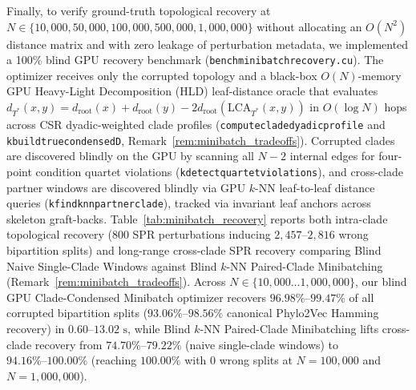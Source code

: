 \documentclass[11pt,a4paper]{article}
\makeatletter
\DeclareRobustCommand{\_}{\ifmmode\nfss@text{\textunderscore}\else\textunderscore\allowbreak\fi}
\theoremstyle{definition}
\makeatother
\begin{document}
Finally, to verify ground-truth topological recovery at $N \in \{10{,}000, 50{,}000, 100{,}000, 500{,}000, 1{,}000{,}000\}$ without allocating an $O(N^2)$ distance matrix and with zero leakage of perturbation metadata, we implemented a 100\% blind GPU recovery benchmark (\texttt{bench\_minibatch\_recovery.cu}). The optimizer receives only the corrupted topology and a black-box $O(N)$-memory GPU Heavy-Light Decomposition (HLD) leaf-distance oracle that evaluates $d_{T^*}(x,y) = d_{\text{root}}(x) + d_{\text{root}}(y) - 2 d_{\text{root}}(\text{LCA}_{T^*}(x,y))$ in $O(\log N)$ hops across CSR dyadic-weighted clade profiles (\texttt{compute\_clade\_dyadic\_profile} and \texttt{k\_build\_true\_condensed\_D}, Remark~\ref{rem:minibatch_tradeoffs}). Corrupted clades are discovered blindly on the GPU by scanning all $N-2$ internal edges for four-point condition quartet violations (\texttt{k\_detect\_quartet\_violations}), and cross-clade partner windows are discovered blindly via GPU $k$-NN leaf-to-leaf distance queries (\texttt{k\_find\_knn\_partner\_clade}), tracked via invariant leaf anchors across skeleton graft-backs. Table~\ref{tab:minibatch_recovery} reports both intra-clade topological recovery ($800$ SPR perturbations inducing $2{,}457\text{--}2{,}816$ wrong bipartition splits) and long-range cross-clade SPR recovery comparing Blind Naive Single-Clade Windows against Blind $k$-NN Paired-Clade Minibatching (Remark~\ref{rem:minibatch_tradeoffs}). Across $N \in \{10{,}000 \dots 1{,}000{,}000\}$, our blind GPU Clade-Condensed Minibatch optimizer recovers $\mathbf{96.98\%\text{--}99.47\%}$ of all corrupted bipartition splits ($\mathbf{93.06\%\text{--}98.56\%}$ canonical Phylo2Vec Hamming recovery) in $0.60\text{--}13.02\text{ s}$, while Blind $k$-NN Paired-Clade Minibatching lifts cross-clade recovery from $74.70\%\text{--}79.22\%$ (naive single-clade windows) to $\mathbf{94.16\%\text{--}100.00\%}$ (reaching $\mathbf{100.00\%}$ with $0$ wrong splits at $N = 100{,}000$ and $N = 1{,}000{,}000$).
\end{document}
